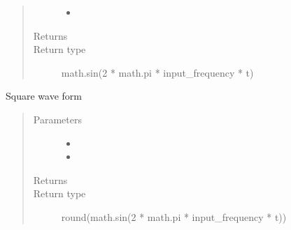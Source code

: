 \documentclass[letterpaper,10pt,english]{sphinxmanual}
\begin{document}
\begin{fulllineitems}
\begin{fulllineitems}
\begin{quote}
\begin{description}
\begin{itemize}
\item {} 
\sphinxAtStartPar
{} \textendash{} 

\end{itemize}

\item[{Returns}] \leavevmode
\sphinxAtStartPar


\item[{Return type}] \leavevmode
\sphinxAtStartPar
math.sin(2 * math.pi * input\_frequency * t)

\end{description}\end{quote}

\end{fulllineitems}


\begin{fulllineitems}
\label{\detokenize{dpav:dpav.audio.wave_table.square}}
\sphinxAtStartPar
Square wave form
\begin{quote}\begin{description}
\item[{Parameters}] \leavevmode\begin{itemize}
\item {} 
\sphinxAtStartPar
{} \textendash{} 

\item {} 
\sphinxAtStartPar
{} \textendash{} 

\end{itemize}

\item[{Returns}] \leavevmode
\sphinxAtStartPar


\item[{Return type}] \leavevmode
\sphinxAtStartPar
round(math.sin(2 * math.pi * input\_frequency * t))

\end{description}\end{quote}

\end{fulllineitems}



\end{fulllineitems}
\end{document}
